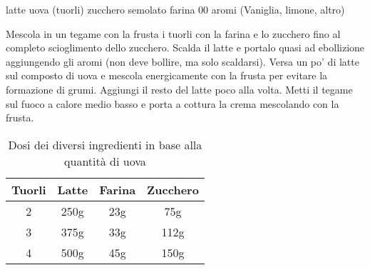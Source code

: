 \label{crema-pasticcera}
\begin{ingreds}
	latte 
	uova (tuorli) 
	zucchero semolato
	farina 00 
	aromi (Vaniglia, limone, altro)
\end{ingreds}
\begin{method}

	Mescola in un tegame con la frusta i tuorli con la farina e lo zucchero fino al completo scioglimento dello zucchero. Scalda il latte e portalo quasi ad ebollizione aggiungendo gli aromi (non deve bollire, ma solo scaldarsi). Versa un po' di latte sul composto di uova e mescola energicamente con la frusta per evitare la formazione di grumi. Aggiungi il resto del latte poco alla volta. Metti il tegame sul fuoco a calore medio basso e porta a cottura la crema mescolando con la frusta.

\begin{table}[h]
	\begin{center}
\begin{tabular}{cccc}
\toprule
	Tuorli	&	Latte	&	Farina	&	Zucchero \\
\midrule
	2	&	250g	&	23g	&	75g \\
	3	&	375g	&	33g	&	112g	\\
	4	&	500g	&	45g	&	150g	\\
\bottomrule
\end{tabular}
	\caption{Dosi dei diversi ingredienti in base alla quantità di uova}
	\end{center}
\end{table}


\end{method}



